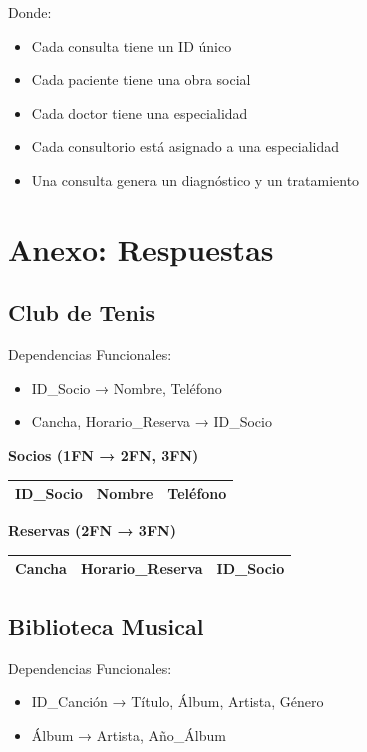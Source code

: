 \documentclass[12pt]{article}
\begin{document}
\vspace{1em}
Donde:
\begin{itemize}
    \item Cada consulta tiene un ID único
    \item Cada paciente tiene una obra social
    \item Cada doctor tiene una especialidad
    \item Cada consultorio está asignado a una especialidad
    \item Una consulta genera un diagnóstico y un tratamiento
\end{itemize}

\newpage

\section{Anexo: Respuestas}

\subsection{Club de Tenis}

Dependencias Funcionales:
\begin{itemize}
    \item ID\_Socio → Nombre, Teléfono
    \item Cancha, Horario\_Reserva → ID\_Socio
\end{itemize}

\textbf{Socios (1FN → 2FN, 3FN)}
\begin{center}
\begin{tabular}{|l|l|l|}
\hline
ID\_Socio & Nombre & Teléfono \\
\hline
\end{tabular}
\end{center}

\textbf{Reservas (2FN → 3FN)}
\begin{center}
\begin{tabular}{|l|l|l|}
\hline
Cancha & Horario\_Reserva & ID\_Socio \\
\hline
\end{tabular}
\end{center}

\subsection{Biblioteca Musical}

Dependencias Funcionales:
\begin{itemize}
    \item ID\_Canción → Título, Álbum, Artista, Género
    \item Álbum → Artista, Año\_Álbum
\end{itemize}
\end{document}
